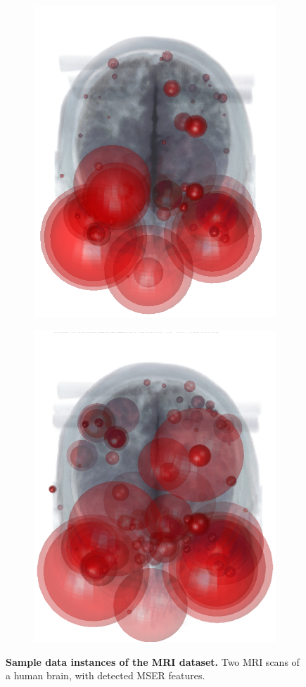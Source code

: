 \begin{figure}[ht]
	\centering 
	\begin{subfigure}[t]{0.35\linewidth} \centering 
		\includegraphics[width=0.8\linewidth]{./fig/eval/mri.png}
		\label{fig/eval/mri1}
	\end{subfigure}
	\begin{subfigure}[t]{0.35\linewidth} \centering 
		\includegraphics[width=0.8\linewidth]{./fig/eval/mri2.png}
		\label{fig/eval/mri2}
	\end{subfigure}
	\caption{\textbf{Sample data instances of the MRI dataset.} Two MRI scans of a human brain, with detected MSER features.}
	\label{fig/eval/mri}
\end{figure}

